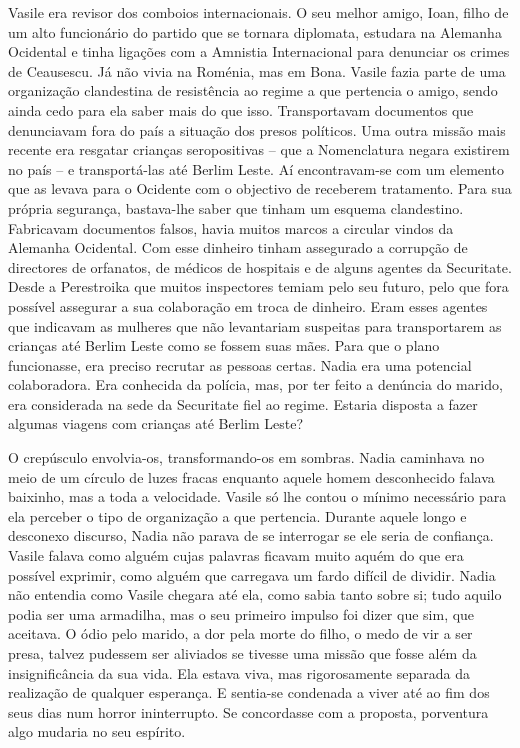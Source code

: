 Vasile era revisor dos comboios internacionais. O seu melhor amigo,
Ioan, filho de um alto funcionário do partido que se tornara
diplomata, estudara na Alemanha Ocidental e tinha ligações com a
Amnistia Internacional para denunciar os crimes de Ceausescu. Já não
vivia na Roménia, mas em Bona. Vasile fazia parte de uma organização
clandestina de resistência ao regime a que pertencia o amigo, sendo
ainda cedo para ela saber mais do que isso. Transportavam documentos que
denunciavam fora do país a situação dos presos políticos. Uma outra
missão mais recente era resgatar crianças seropositivas -- que a
Nomenclatura negara existirem no país -- e transportá-las até Berlim
Leste. Aí encontravam-se com um elemento que as levava para o Ocidente
com o objectivo de receberem tratamento. Para sua própria segurança,
bastava-lhe saber que tinham um esquema clandestino. Fabricavam documentos falsos, havia muitos marcos a circular vindos da Alemanha
Ocidental. Com esse dinheiro tinham assegurado a corrupção de
directores de orfanatos, de médicos de hospitais e de alguns agentes da
Securitate. Desde a Perestroika que muitos inspectores temiam pelo seu
futuro,
pelo que fora possível assegurar a sua colaboração em troca de dinheiro.
Eram esses agentes que indicavam as mulheres que não levantariam
suspeitas para transportarem as crianças até Berlim Leste como se
fossem suas mães. Para que o plano funcionasse, era preciso recrutar as
pessoas certas. Nadia era uma potencial colaboradora. Era conhecida da
polícia, mas, por ter feito a denúncia do marido, era considerada na
sede da Securitate fiel ao regime. Estaria disposta a fazer algumas
viagens com crianças até Berlim Leste?

O crepúsculo envolvia-os, transformando-os em sombras. Nadia caminhava
no meio de um círculo de luzes fracas enquanto aquele homem desconhecido
falava baixinho, mas a toda a velocidade. Vasile só lhe contou o mínimo
necessário para ela perceber o tipo de organização a que pertencia.
Durante aquele longo e desconexo discurso, Nadia não parava de se
interrogar se ele seria de confiança. Vasile falava como alguém cujas
palavras ficavam muito aquém do que era possível exprimir, como alguém
que carregava um fardo difícil de dividir. Nadia não entendia como
Vasile chegara até ela, como sabia tanto sobre si; tudo aquilo podia ser
uma armadilha, mas o seu primeiro impulso foi dizer que sim, que
aceitava. O ódio pelo marido, a dor pela morte do filho, o medo de vir a
ser presa, talvez pudessem ser aliviados se tivesse uma missão que fosse
além da insignificância da sua vida. Ela estava viva, mas rigorosamente
separada da realização de qualquer esperança. E sentia-se condenada a
viver até ao fim dos seus dias num horror ininterrupto. Se concordasse
com a proposta, porventura algo mudaria no seu espírito.


